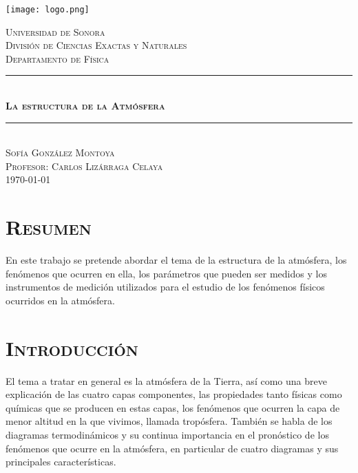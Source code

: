 \documentclass[12pt]{article}
\begin{document}

\begin{titlepage}
\newcommand{\Hrule}{\rule{\linewidth}{0.5mm}}

\begin{center}
\texttt{[image: logo.png]}
\end{center}

\begin{center}
\textsc{\LARGE Universidad de Sonora}\\[0.5cm]
\textsc{División de Ciencias Exactas y Naturales}\\[0.1cm]
\textsc{Departamento de Física}\\[1.5cm]
\Hrule \\[0.5cm]   
   \textsc{\Huge \bfseries La estructura de la Atmósfera} \\[0.5cm]
\Hrule \\[1.5cm]
\textsc{\Large Sofía González Montoya} \\[1cm]
\textsc{\Large Profesor: Carlos Lizárraga Celaya} \\[2.5cm]
\textsc{\today}
\end{center}
\end{titlepage}
\pagebreak


\doublespacing
\section{\textsc{\Large Resumen}}

En este trabajo se pretende abordar el tema de la estructura de la atmósfera, los fenómenos que ocurren en ella, los parámetros que pueden ser medidos y los instrumentos de medición utilizados para el estudio de los fenómenos físicos ocurridos en la atmósfera. 

\section{\textsc{\Large Introducción}}
El tema a tratar en general es la atmósfera de la Tierra, así como una breve explicación de las cuatro capas componentes, las propiedades tanto físicas como químicas que se producen en estas capas, los fenómenos que ocurren la capa de menor altitud en la que vivimos, llamada tropósfera. También se habla de los diagramas termodinámicos y su continua importancia en el pronóstico de los fenómenos que ocurre en la atmósfera, en particular de cuatro diagramas y sus principales características. \\
\end{document}
